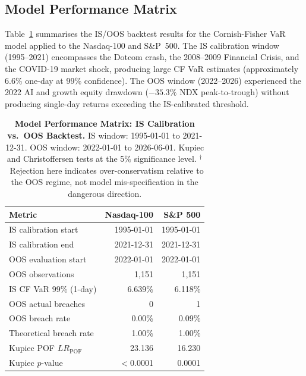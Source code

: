 \subsection{Model Performance Matrix}

Table~\ref{tab:performance} summarises the IS/OOS backtest results for the
Cornish-Fisher VaR model applied to the Nasdaq-100 and S\&P~500. The IS calibration
window (1995--2021) encompasses the Dotcom crash, the 2008--2009 Financial Crisis, and
the COVID-19 market shock, producing large CF VaR estimates (approximately 6.6\% one-day
at 99\% confidence). The OOS window (2022--2026) experienced the 2022 AI and growth
equity drawdown ($-35.3\%$ NDX peak-to-trough) without producing single-day returns
exceeding the IS-calibrated threshold.

\begin{table}[htbp]
  \centering
  \caption{
    \textbf{Model Performance Matrix: IS Calibration vs.\ OOS Backtest.}
    IS window: 1995-01-01 to 2021-12-31.
    OOS window: 2022-01-01 to 2026-06-01.
    Kupiec and Christoffersen tests at the 5\% significance level.
    $^{\dagger}$~Rejection here indicates over-conservatism relative to the OOS regime,
    not model mis-specification in the dangerous direction.
  }
  \label{tab:performance}
  \begin{tabular}{lrr}
    \toprule
    \textbf{Metric} & \textbf{Nasdaq-100} & \textbf{S\&P 500} \\
    \midrule
    IS calibration start            & 1995-01-01   & 1995-01-01   \\
    IS calibration end              & 2021-12-31   & 2021-12-31   \\
    OOS evaluation start            & 2022-01-01   & 2022-01-01   \\
    OOS observations                & 1{,}151       & 1{,}151       \\
    \midrule
    IS CF VaR 99\% (1-day)         & 6.639\%      & 6.118\%      \\
    OOS actual breaches             & 0            & 1            \\
    OOS breach rate                 & 0.00\%       & 0.09\%       \\
    Theoretical breach rate         & 1.00\%       & 1.00\%       \\
    \midrule
    Kupiec POF $LR_{\text{POF}}$    & 23.136       & 16.230       \\
    Kupiec $p$-value                & $<$0.0001    & 0.0001       \\

\end{tabular}
\end{table}
